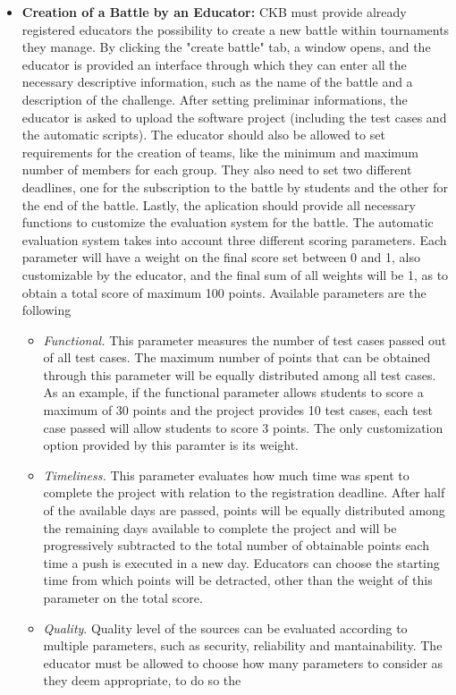 \documentclass[a4paper, 11pt, titlepage]{article}
\begin{document}
\begin{itemize}
    \item \textbf{Creation of a Battle by an Educator:} CKB must provide already registered educators the possibility to create a new battle 
    within tournaments they manage. By clicking the "create battle" tab, a window opens, and the educator is provided an interface through which they can enter all the 
    necessary descriptive information, such as the name of the battle and a description of the challenge. After setting preliminar informations, the educator is asked to upload the software project (including the test cases and the 
    automatic scripts). The educator should also be allowed to set requirements for the creation of teams, like the minimum and maximum number of members for each group. They also need to set two different deadlines, one 
    for the subscription to the battle by students and the other for the end of the battle.
    Lastly, the aplication should provide all necessary functions to customize the evaluation system for the battle. The automatic evaluation system takes into account three different scoring parameters. Each parameter will have a weight on the final score
    set between 0 and 1, also customizable by the educator, and the final sum of all weights will be 1, as to obtain a total score of maximum 100 points. Available parameters are the following
    \begin{itemize}
        \item \textit{Functional.} This parameter measures the number of test cases passed out of all test cases. The maximum number of points that can be obtained through this parameter will be equally distributed among all test cases. 
        As an example, if the functional parameter allows students to score a maximum of 30 points and the project provides 10 test cases, each test case passed will allow
        students to score 3 points. The only customization option provided by this paramter is its weight.
        \item \textit{Timeliness.} This parameter evaluates how much time was spent to complete the project with relation to the registration deadline. After half of the available days are passed, points will be equally 
        distributed among the remaining days available to complete the project and will be progressively subtracted to the total number of obtainable points each time a push is executed in a new day. Educators can choose the starting time from which points will be 
        detracted, other than the weight of this parameter on the total score. 
        \item \textit{Quality}. Quality level of the sources can be evaluated according to multiple parameters, such as security, reliability and mantainability. The educator must be allowed to choose how many parameters to consider as they deem appropriate, to do so the 

\end{itemize}
\end{itemize}
\end{document}
